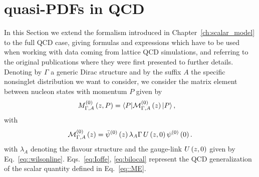 
\section{quasi-PDFs in QCD}
\label{sec:qPDFs_th}
%
In this Section we extend the formalism introduced in Chapter~\ref{ch:scalar_model} to the full QCD case,
giving formulas and expressions which have to be used when working with data coming from lattice QCD simulations,
and referring to the original publications where they were first presented to further details.
Denoting by $\Gamma$ a generic Dirac structure and by the suffix $A$ the specific nonsinglet distribution
we want to consider, we consider the matrix element between nucleon states with momentum $P$ given by
\begin{align}
	\label{eq:Ioffe}
	M^{(0)}_{\Gamma,A}\left(z,P\right) &= \langle P |\mathcal{M}^{(0)}_{\Gamma,A}\left(z\right) |P\rangle \, ,
\end{align}
with
\begin{align}
	\label{eq:bilocal}
	\mathcal{M}^{(0)}_{\Gamma,A}\left(z\right)= \bar{\psi}^{(0)}\left( z\right) \lambda_A \Gamma \,   
	U\left( z,0\right) \psi^{(0)}\left( 0\right).
\end{align}
with $\lambda_A$ denoting the flavour structure and the gauge-link $U\left( z,0\right)$ given by Eq.~\eqref{eq::wilsonline}.
Eqs.~\eqref{eq:Ioffe}, \eqref{eq:bilocal} represent the QCD generalization of the scalar quantity defined 
in Eq.~\eqref{eq::ME}.

